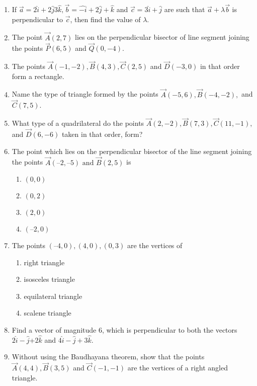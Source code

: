 \begin{enumerate}[label=\thesubsection.\arabic*, ref=\thesubsection.\theenumi]
\item If $\overrightarrow {a}=2\hat{i}+2\hat{j}3\hat{k}, \overrightarrow {b}=\hat{-i}+2\hat{j}+\hat{k}$ and $\overrightarrow {c}=3\hat{i}+\hat{j}$ are such that $\overrightarrow {a}+\lambda\overrightarrow {b}$ is perpendicular to $\overrightarrow {c}$, then find the value of $\lambda$.
	\\
		
\item The point $\vec{A}(2, 7)$ lies on the perpendicular bisector of line segment joining the points $\vec{P}(6, 5)$ and $ \vec{Q}(0, -4)$.
\item The points $\vec{A}(-1, -2),  \vec{B}(4, 3),  \vec{C}(2, 5) $ and $ \vec{D}(-3, 0)$ in that order form a rectangle.
\item Name the type of triangle formed by the points $\vec{A}(-5, 6), \vec{B}(-4, -2), $ and $\vec{C}(7, 5)$.
\item What type of a quadrilateral do the points $\vec{A}(2, -2), \vec{B}(7, 3), \vec{C}(11, -1), $ and $\vec{D}(6, -6)$ taken in that order,  form?
\item The point which lies on the perpendicular bisector of the line segment joining the
	points $\vec{A} (–2,  –5)\text { and } \vec{B} (2,  5) $ is
\begin{enumerate}
\item  	$(0,  0)$
\item  $(0,  2)$ 
\item  $(2,  0)$ 
\item  $(–2,  0)$
\end{enumerate}
\item The points $ (–4,  0),  (4,  0),  (0,  3) $ are the vertices of
	\begin{enumerate}
\item right triangle 
\item isosceles triangle
\item  equilateral triangle
\item  scalene triangle 
\end{enumerate}
\item Find a vector of magnitude 6,  which is perpendicular to both the vectors $2\hat{i}-\hat{j}$+$2\hat{k}$ and $4\hat{i}-\hat{j}+3\hat{k}$.
\item Without using the Baudhayana theorem,  show that the points $\vec{A}(4, 4),  \vec{B}(3, 5)$ and $\vec{C}(-1, -1)$ are the vertices of a right angled triangle.
\label{chapters/11/10/1/6}
\\
\solution


\end{enumerate}
